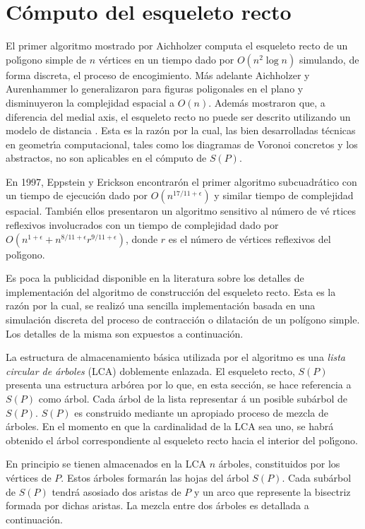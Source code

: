 \documentclass[12pt,english]{report}
\begin{document}
\section{C\'omputo del esqueleto recto}

El primer algoritmo mostrado por Aichholzer \cite{AA} computa el esqueleto recto
de un pol\'{\i}gono simple de $n$ v\'ertices en un tiempo dado por $O(n^2\log{n})$
simulando, de forma discreta, el proceso de encogimiento. M\'{a}s adelante
Aichholzer y Aurenhammer \cite{AA2} lo generalizaron para figuras poligonales en el
plano y disminuyeron la complejidad espacial a $O(n)$. Adem\'as
mostraron que, a diferencia del medial axis, el esqueleto recto no puede ser descrito utilizando un modelo de distancia . Esta es la raz\'{o}n por la
cual, las bien desarrolladas t\'{e}cnicas en geometr\'{\i}a computacional,
tales como los diagramas de Voronoi concretos y los abstractos, no son
aplicables en el c\'{o}mputo de $S(P)$. 

En 1997, Eppstein y Erickson \cite{EE} encontrar\'on el primer algoritmo subcuadr\'{a}tico con un tiempo de ejecuci\'on dado por $O(n^{17/11+\epsilon})$ y similar tiempo de complejidad espacial. Tambi\'{e}n ellos presentaron un algoritmo sensitivo al n\'{u}mero de v\'{e}%
rtices reflexivos involucrados con un tiempo de complejidad dado por $O(n^{1+\epsilon}+
n^{8/11+\epsilon}r^{9/11+\epsilon})$, donde $r$ es el n\'{u}mero de v\'{e}rtices reflexivos del pol\'{\i}gono.

Es poca la publicidad disponible en la literatura sobre los detalles de implementaci\'on del algoritmo de construcci\'on del esqueleto recto. Esta es la raz\'on por la cual, se realiz\'o una sencilla implementaci\'on basada en una simulaci\'on discreta del proceso de contracci\'on o dilataci\'on de un pol\'igono simple. Los detalles de la misma son expuestos a continuaci\'on.\bigskip

La estructura de almacenamiento b\'{a}sica utilizada por el algoritmo es una 
\emph{lista circular de \'{a}rboles} (LCA) doblemente enlazada. El esqueleto recto, $S(P)$
presenta una estructura arb\'{o}rea por lo que, en esta secci\'{o}n, se hace
referencia a $S(P)$ como \'{a}rbol. Cada \'{a}rbol de la lista representar%
\'{a} un posible sub\'{a}rbol de $S(P)$. $S(P)$ es construido mediante un
apropiado proceso de mezcla de \'{a}rboles. En el momento en que la
cardinalidad de la LCA sea uno, se habr\'{a} obtenido el \'{a}rbol
correspondiente al esqueleto recto hacia el interior del pol\'{\i}gono.

En principio se tienen almacenados en la LCA $n$ \'{a}rboles, constituidos
por los v\'{e}rtices de $P$. Estos \'{a}rboles formar\'{a}n las hojas del 
\'{a}rbol $S(P)$. Cada sub\'{a}rbol de $S(P)$ tendr\'{a} asosiado dos aristas de $P$ y un
arco que represente la bisectriz formada por dichas aristas. La mezcla entre
dos \'{a}rboles es detallada a continuaci\'{o}n.
\end{document}
